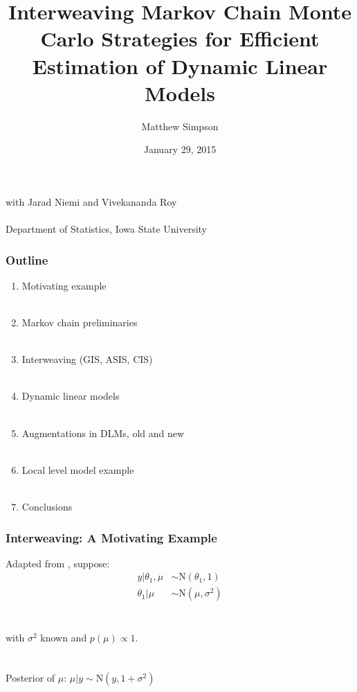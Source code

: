 \documentclass[xcolor=dvipsnames]{beamer}
\title[Interweaving MCMC Strats for DLMs]{Interweaving Markov Chain Monte Carlo Strategies for Efficient
Estimation of Dynamic Linear Models}
\author[Matt Simpson]{Matthew Simpson}
\date{January 29, 2015}
\institute[]{Departments of Statistics and Economics, Iowa State University}
\newcommand\N{\mathrm{N}}
\begin{document}
\begin{frame}
\titlepage
\begin{center}
with Jarad Niemi and Vivekananda Roy\\~\\
\scriptsize{Department of Statistics, Iowa State University}
\end{center}
\end{frame}

\begin{frame}
\frametitle{Outline}
\begin{enumerate}
\item Motivating example\\~\\
\item Markov chain preliminaries\\~\\
\item Interweaving (GIS, ASIS, CIS)\\~\\
\item Dynamic linear models\\~\\
\item Augmentations in DLMs, old and new\\~\\
\item Local level model example\\~\\
\item Conclusions
\end{enumerate}
\end{frame}


\begin{frame}
\frametitle{Interweaving: A Motivating Example}
Adapted from \citet{yu2011center}, suppose:\\
\begin{align*}
y|\theta_1, \mu & \sim \N(\theta_1, 1) \\
\theta_1|\mu & \sim \N(\mu, \sigma^2) 
\end{align*}\\~\\
with $\sigma^2$ known and $p(\mu)\propto 1$.\\~\\~\\

Posterior of $\mu$: $\mu|y \sim \N(y,1+\sigma^2)$

\end{frame}
\end{document}
